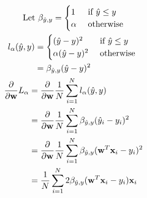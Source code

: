 \documentclass{introtosml}
\newcommand\fancyb{\beta_{\hat{y}, y}}
\begin{document}
\begin{p}
  \item
    \begin{gather*}
      \text{Let} \fancyb = \begin{cases}
        1 & \mif \hat{y} \le y \\
        \alpha & \otherwise
      \end{cases} \\
      \begin{aligned}
        l_\alpha(\hat{y}, y)
        & = \begin{cases}
          (\hat{y} - y)^2 & \mif \hat{y} \le y \\
          \alpha (\hat{y} - y)^2 & \otherwise
        \end{cases} \\
        & = \fancyb (\hat{y} - y)^2
      \end{aligned} \\
      \begin{aligned}
        \frac{\partial}{\partial \vec{w}} L_\alpha
        & = \frac{\partial}{\partial \vec{w}}
            \frac{1}{N} \sum_{i=1}^N l_\alpha(\hat{y}, y) \\
        & = \frac{\partial}{\partial \vec{w}}
            \frac{1}{N} \sum_{i=1}^N \fancyb (\hat{y}_i - y_i)^2 \\
        & = \frac{\partial}{\partial \vec{w}}
            \frac{1}{N} \sum_{i=1}^N \fancyb (\vec{w}^T \vec{x}_i - y_i)^2 \\
        & = \frac{1}{N} \sum_{i=1}^N 2 \fancyb (\vec{w}^T \vec{x}_i - y_i) \vec{x}_i \\
      \end{aligned}
    \end{gather*}
\end{p}
\end{document}
